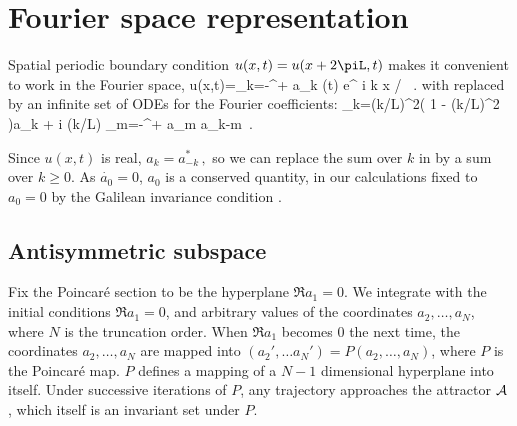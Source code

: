 \section{Fourier space representation} 
\label{s:FourierModes}



\noindent
Spatial periodic boundary condition $u(x,t)=u(x+2\piL,t)$
makes it convenient to work in the Fourier space, 
\beq
  u(x,t)=\sum_{k=-\infty}^{+\infty} a_k (t) e^{ i k x / }
\, .
with  replaced by an infinite set of 
ODEs for the Fourier coefficients:
\beq
_k=(k/L)^2\left( 1 - (k/L)^2  \right)a_k 
 	 + i (k/L) \sum_{m=-\infty}^{+\infty} a_m a_{k-m}
\,.
%


Since $u(x,t)$ is real,
$ %
a_k=a_{-k}^*
\,,
$ %
so we can replace the sum over $k$ in  by a
sum over $k \geq 0$.
As  $\dot{a_0}=0$, $a_0$ is a conserved quantity,
in our calculations
fixed to $a_0=0$ by
the Galilean invariance condition .


\subsection{Antisymmetric subspace} 
\label{s:AntisymmSubsp}

Fix the  Poincar\'e section to be the hyperplane
$\Re a_1=0$. We integrate  with the initial
 conditions
$\Re a_1=0$, and arbitrary values of the coordinates  $a_2, \ldots, a_N$, where
$N$ is the truncation order.  When $\Re a_1$ becomes
$0$ the next time,  the coordinates  $a_2, \ldots, a_N$ are mapped
into $(a_2', \ldots a_N')=P(a_2, \ldots, a_N)$, where $P$ is the  Poincar\'e
map. $P$ defines a mapping of a $N-1$ dimensional hyperplane into itself.
Under successive iterations of  $P$, any trajectory
approaches the attractor ${\cal A}$, which itself is an invariant
set under $P$.

